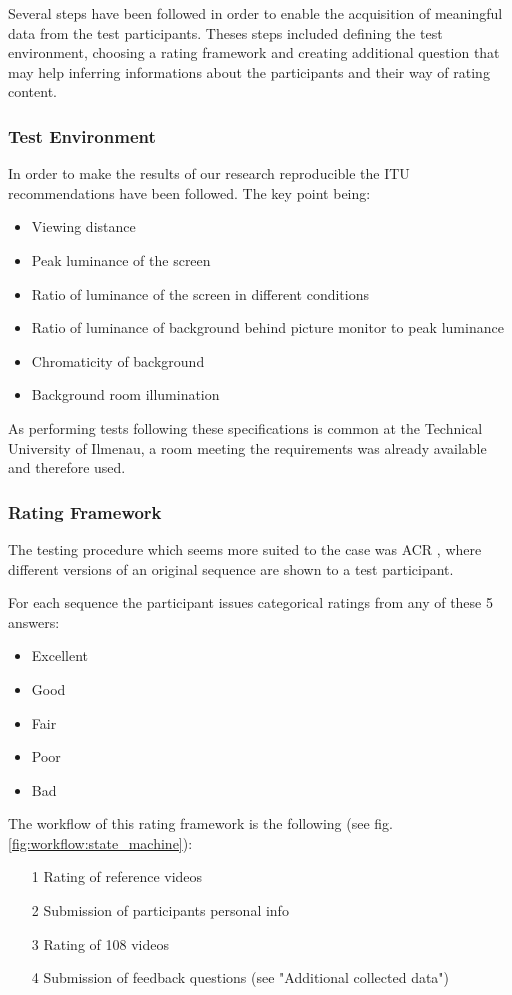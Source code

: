 Several steps have been followed in order to enable the acquisition of meaningful data from the test participants. Theses steps included defining the test environment, choosing a rating framework and creating additional question that may help inferring informations about the participants and their way of rating content.

\subsubsection{Test Environment}
In order to make the results of our research reproducible the ITU recommendations \cite{rec1998p} have been followed. 
The key point being:
\begin{itemize}
	\item Viewing distance
	\item Peak luminance of the screen
	\item Ratio of luminance of the screen in different conditions
	\item Ratio of luminance of background behind picture monitor to peak luminance
	\item Chromaticity of background
	\item Background room illumination
\end{itemize}

As performing tests following these specifications is common at the Technical University of Ilmenau, a room meeting the requirements was already available and therefore used.

	
\subsubsection{Rating Framework}
The testing procedure which seems more suited to the case was ACR \cite{rec1998p}, where different versions of an original sequence are shown to a test participant. 

For each sequence the participant issues categorical ratings from any of these 5 answers: 
\begin{itemize}
	\item Excellent
	\item Good
	\item Fair
	\item Poor
	\item Bad
\end{itemize}


The workflow of this rating framework is the following (see fig. \ref{fig:workflow:state_machine}):
\begin{enumerate}
	\item[1] Rating of reference videos
	\item[2] Submission of participants personal info
	\item[3] Rating of 108 videos
	\item[4] Submission of feedback questions (see "Additional collected data")
\end{enumerate}

